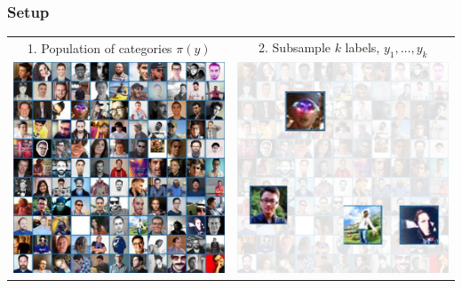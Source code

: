 \documentclass{beamer}
\begin{document}
\begin{frame}
\frametitle{Setup}

\begin{center}
\begin{tabular}{c|c}
1. Population of categories $\pi(y)$ & 
2. Subsample $k$ labels, $y_1,\hdots, y_k$\\
\includegraphics[scale = 0.2]{facegrid.png} &
\includegraphics[scale = 0.2]{facegrid_samp.png}
\end{tabular}
\end{center}


\end{frame}
\end{document}
